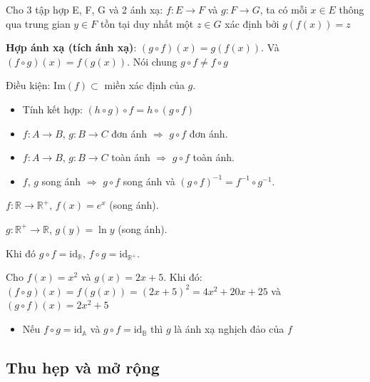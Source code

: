 \documentclass[12pt,a4paper]{article}
\begin{document}
\begin{dinhnghia}
  Cho 3 tập hợp E, F, G và 2 ánh xạ: $f: E \to F$ và $g: F \to G$, ta có mỗi $x \in E$ thông qua trung gian $y \in F$ tồn tại duy nhất một $z \in G$ xác định bởi $g(f(x)) = z$

  \textbf{Hợp ánh xạ (tích ánh xạ)}: $(g \circ f)(x) = g(f(x))$. Và $(f \circ g)(x) = f(g(x))$. Nói chung $g \circ f \neq f \circ g$
  
  Điều kiện: $\mathrm{Im}(f) \subset$ miền xác định của $g$.
\end{dinhnghia}

\begin{tinhchat}[title={Tính chất hợp ánh xạ}]
  \begin{itemize}
    \item Tính kết hợp: $(h \circ g) \circ f = h \circ (g \circ f)$
    \item $f: A \to B$, $g: B \to C$ đơn ánh $\Rightarrow$ $g \circ f$ đơn ánh.
    \item $f: A \to B$, $g: B \to C$ toàn ánh $\Rightarrow$ $g \circ f$ toàn ánh.
    \item $f$, $g$ song ánh $\Rightarrow$ $g \circ f$ song ánh và $(g \circ f)^{-1} = f^{-1} \circ g^{-1}$.
  \end{itemize}
\end{tinhchat}

\begin{vidu}
  $f: \mathbb{R} \to \mathbb{R}^+$, $f(x) = e^x$ (song ánh). 
  
  $g: \mathbb{R}^+ \to \mathbb{R}$, $g(y) = \ln y$ (song ánh). 
  
  Khi đó $g \circ f = \mathrm{id}_\mathbb{R}$, $f \circ g = \mathrm{id}_{\mathbb{R}^+}$.

  Cho $f(x) = x^2$ và $g(x) = 2x + 5$. Khi đó: $(f \circ g)(x) = f(g(x)) = (2x + 5)^2 = 4x^2 + 20x + 25$ và $(g \circ f)(x) = 2x^2 + 5$
\end{vidu}

\begin{luuy}
    \begin{itemize}
        \item Nếu $f \circ g = \mathrm{id}_\mathbb{A}$ và $g \circ f = \mathrm{id}_{\mathbb{B}}$ thì $g$ là ánh xạ nghịch đảo của $f$
    \end{itemize}
\end{luuy}

\subsection{Thu hẹp và mở rộng}
\end{document}
